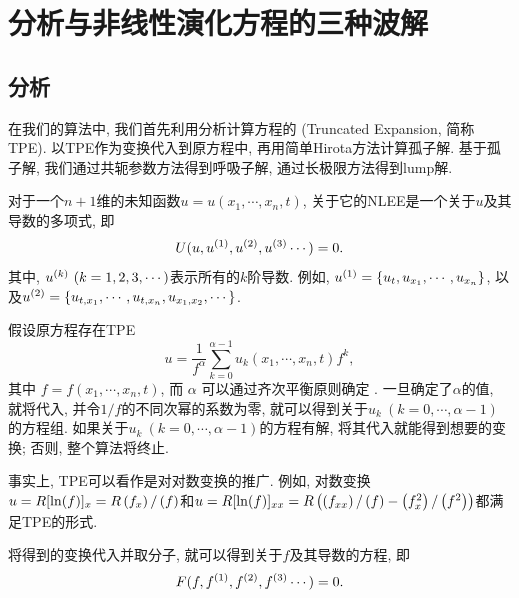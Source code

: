\chapter{\Painleve{}分析与非线性演化方程的三种波解}\label{ch02}
\section{\Painleve{}分析}

在我们的算法中, 我们首先利用\Painleve{}分析计算方程的 (Truncated \Painleve{} Expansion, 简称TPE)\cite{xu2004symbolic,xu2009note}. 以TPE作为变换代入到原方程中, 再用简单Hirota方法计算孤子解. 基于孤子解, 我们通过共轭参数方法得到呼吸子解, 通过长极限方法得到lump解. 

对于一个$n+1$维的未知函数$u=u(x_1,\cdots,x_n,t)$, 关于它的NLEE是一个关于$u$及其导数的多项式, 即
\begin{equation}
    U(u,u^{(1)},u^{(2)},u^{(3)}\cdots)=0. \label{oeq}
\end{equation}
其中, $u^{(k)}~(k=1,2,3,\cdots)$表示所有的$k$阶导数. 例如, $u^{(1)}=\left\{u_t,u_{x_1},\cdots,u_{x_n}\right\}$, 以及$u^{(2)}=\left\{u_{t,x_1},\cdots,u_{t,x_n},u_{x_1,x_2},\cdots\right\}$.

假设原方程存在TPE
\begin{equation}
    u=\frac{1}{f^\alpha}\sum_{k=0}^{\alpha-1}{u_k(x_1,\cdots,x_n,t) f^k}, \label{tr}
\end{equation}
其中 $f=f(x_1,\cdots,x_n,t)$, 而 $\alpha$ 可以通过齐次平衡原则确定 \cite{wang1995solitary,wang1996application}. 一旦确定了$\alpha$的值, 就将代入, 并令$1/f$的不同次幂的系数为零, 就可以得到关于$u_k~(k=0,\cdots,\alpha-1)$的方程组. 如果关于$u_k~(k=0,\cdots,\alpha-1)$的方程有解, 将其代入就能得到想要的变换; 否则, 整个算法将终止.

事实上, TPE可以看作是对对数变换的推广. 例如, 对数变换$u=R[\ln(f)]_x=R\left(f_x\right)/\left(f\right)$和$u=R[\ln(f)]_{xx}=R\left(\left(f_{xx}\right)/\left(f\right)-\left(f_x^2\right)/\left(f^2\right)\right)$都满足TPE的形式.

将得到的变换代入并取分子, 就可以得到关于$f$及其导数的方程, 即
\begin{equation}
    F(f,f^{(1)},f^{(2)},f^{(3)}\cdots)=0. \label{feq}
\end{equation}


